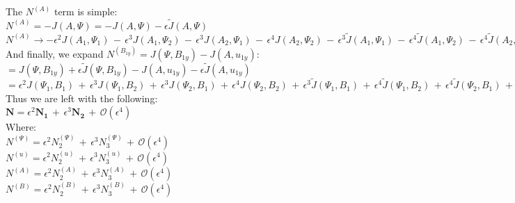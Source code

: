 \documentclass[letterpaper,12pt]{article}
\begin{document}
The $N^{(A)}$ term is simple: \\

$N^{(A)} = -J(A, \Psi) = -J(A, \Psi) - \epsilon\widetilde{J}(A, \Psi)$ \\

$N^{(A)} \to -\epsilon^2 J(A_1, \Psi_1) \, - \, \epsilon^3 J(A_1, \Psi_2) \, - \, \epsilon^3 J(A_2, \Psi_1) \, - \, \epsilon^4 J(A_2, \Psi_2) \, - \, \epsilon^3 \widetilde{J}(A_1, \Psi_1) \, - \, \epsilon^4 \widetilde{J}(A_1, \Psi_2) \, - \, \epsilon^4 \widetilde{J}(A_2, \Psi_1) \, - \, \epsilon^5 \widetilde{J}(A_2, \Psi_2)$ \\

And finally, we expand $N^{(B_{1y})} = J(\Psi, B_{1y}) - J(A, u_{1y})$: \\

$= J(\Psi, B_{1y}) + \epsilon\widetilde{J}(\Psi, B_{1y}) - J(A, u_{1y}) - \epsilon\widetilde{J}(A, u_{1y})$ \\

$ = \epsilon^2 J(\Psi_1, B_1) \, + \, \epsilon^3 J(\Psi_1, B_2) \, + \, \epsilon^3 J(\Psi_2, B_1) \, + \, \epsilon^4 J(\Psi_2, B_2) \, + \, \epsilon^3\widetilde{J}(\Psi_1, B_1) \, + \, \epsilon^4\widetilde{J}(\Psi_1, B_2) \, + \, \epsilon^4 \widetilde{J}(\Psi_2, B_1) \, + \, \epsilon^5 \widetilde{J}(\Psi_2, B_2) \, - \, \epsilon^2 J(A_1, u_1) \, - \, \epsilon^3 J(A_1, u_2) \, - \, \epsilon^3 J(A_2, u_1) \, - \, \epsilon^4 J(A_2, u_2) \, - \, \epsilon^3 \widetilde{J}(A_1, u_1) \, - \, \epsilon^4 \widetilde{J}(A_1, u_2) \, - \, \epsilon^4 \widetilde{J}(\Psi_2, B_1) \, - \, \epsilon^5 \widetilde{J}(\Psi_2, B_2)$\\

Thus we are left with the following: \\

$\mathbf{N} = \epsilon^2\mathbf{N_1} \, + \, \epsilon^3\mathbf{N_2} \, + \, \mathcal{O}(\epsilon^4)$ \\

Where: \\

\noindent $N^{(\Psi)} = \epsilon^2 N_2^{(\Psi)} \, + \, \epsilon^3 N_3^{(\Psi)} \, + \, \mathcal{O}(\epsilon^4)$ \\
$N^{(u)} = \epsilon^2 N_2^{(u)} \, + \, \epsilon^3 N_3^{(u)} \, + \, \mathcal{O}(\epsilon^4)$ \\
$N^{(A)} = \epsilon^2 N_2^{(A)} \, + \, \epsilon^3 N_3^{(A)} \, + \, \mathcal{O}(\epsilon^4)$ \\
$N^{(B)} = \epsilon^2 N_2^{(B)} \, + \, \epsilon^3 N_3^{(B)} \, + \, \mathcal{O}(\epsilon^4)$ \\
\end{document}
